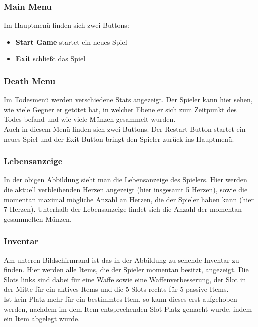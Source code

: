 \subsubsection{Main Menu}
Im Hauptmenü finden sich zwei Buttons:
\begin{itemize}
\item \textbf{Start Game} startet ein neues Spiel
\item \textbf{Exit} schließt das Spiel
\end{itemize}

\subsubsection{Death Menu}
Im Todesmenü werden verschiedene Stats angezeigt. Der Spieler kann hier sehen, wie viele Gegner er getötet hat, in welcher Ebene er sich zum Zeitpunkt des Todes befand und wie viele Münzen gesammelt wurden.\\
Auch in diesem Menü finden sich zwei Buttons. Der Restart-Button startet ein neues Spiel und der Exit-Button bringt den Spieler zurück ins Hauptmenü.

\subsubsection{Lebensanzeige}
In der obigen Abbildung sieht man die Lebensanzeige des Spielers. Hier werden die aktuell verbleibenden Herzen angezeigt (hier insgesamt 5 Herzen), sowie die momentan maximal mögliche Anzahl an Herzen, die der Spieler haben kann (hier 7 Herzen). Unterhalb der Lebensanzeige findet sich die Anzahl der momentan gesammelten Münzen.

\subsubsection{Inventar}
Am unteren Bildschirmrand ist das in der Abbildung zu sehende Inventar zu finden. Hier werden alle Items, die der Spieler momentan besitzt, angezeigt. Die Slots links sind dabei für eine Waffe sowie eine Waffenverbesserung, der Slot in der Mitte für ein aktives Items und die 5 Slots rechts für 5 passive Items. \\
Ist kein Platz mehr für ein bestimmtes Item, so kann dieses erst aufgehoben werden, nachdem im dem Item entsprechenden Slot Platz gemacht wurde, indem ein Item abgelegt wurde.


